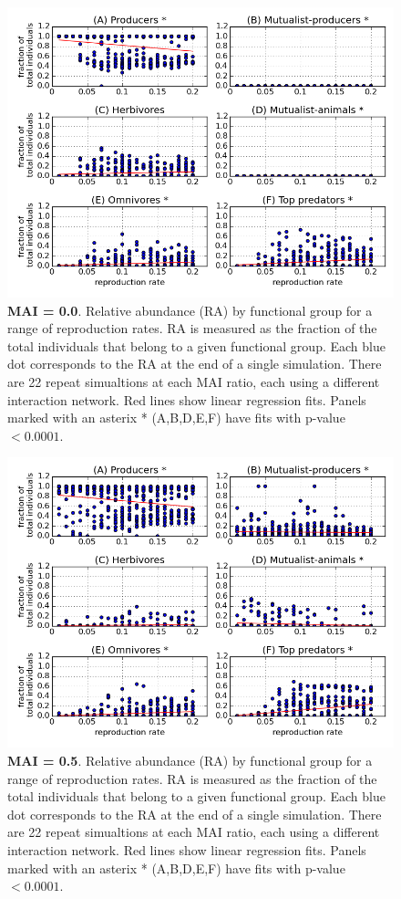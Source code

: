 \begin{figure}
	\centering
	\includegraphics[width=0.8\linewidth]{"figures/rr_proportion_per_functional_group_mai00"}
	\caption{\textbf{MAI = 0.0}. Relative abundance (RA) by functional group for a range of reproduction rates. RA is measured as the fraction of the total individuals that belong to a given functional group. Each blue dot corresponds to the RA at the end of a single simulation. There are 22 repeat simualtions at each MAI ratio, each using a different interaction network. Red lines show linear regression fits. Panels marked with an asterix * (A,B,D,E,F) have fits with p-value $< 0.0001$.}
	\label{fig:rr_prop_per_fg_mai0}
\end{figure}

\begin{figure}
	\centering
	\includegraphics[width=0.8\linewidth]{"figures/rr_proportion_per_functional_group_mai05"}
	\caption{\textbf{MAI = 0.5}. Relative abundance (RA) by functional group for a range of reproduction rates. RA is measured as the fraction of the total individuals that belong to a given functional group. Each blue dot corresponds to the RA at the end of a single simulation. There are 22 repeat simualtions at each MAI ratio, each using a different interaction network. Red lines show linear regression fits. Panels marked with an asterix * (A,B,D,E,F) have fits with p-value $< 0.0001$.}
	\label{fig:rr_prop_per_fg_mai05}
\end{figure}



